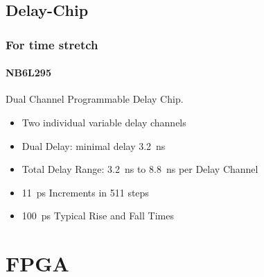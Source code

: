 \subsection{Delay-Chip}
\subsubsection{For time stretch}
\paragraph{NB6L295}
Dual Channel Programmable Delay Chip.

\begin{itemize}
	\item Two individual variable delay channels
	\item Dual Delay: minimal delay \SI{3.2}{\nano \second}
	\item Total Delay Range: \SI{3.2}{\nano \second} to \SI{8.8}{\nano \second} per Delay Channel
	\item \SI{11}{\pico \second} Increments in 511 steps
	\item \SI{100}{\pico \second} Typical Rise and Fall Times
\end{itemize}

\newpage
\section{FPGA}
